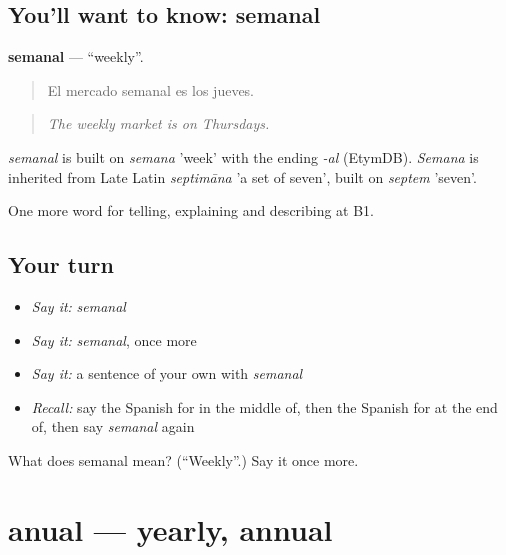 \subsection*{You'll want to know: semanal}
\textbf{semanal} — \textquotedblleft{}weekly\textquotedblright{}.

\begin{quote}
El mercado semanal es los jueves.
\end{quote}

\begin{quote}
\emph{The weekly market is on Thursdays.}
\end{quote}

\begin{cousinweb}
\emph{semanal} is built on \emph{semana} 'week' with the ending \emph{-al} (EtymDB). \emph{Semana} is inherited from Late Latin \emph{septimāna} 'a set of seven', built on \emph{septem} 'seven'.
\end{cousinweb}

\begin{grammarlens}[title={What you've built}]
One more word for telling, explaining and describing at B1.
\end{grammarlens}

\subsection*{Your turn}
\begin{itemize}
\raggedright
  \item \emph{Say it:} \emph{semanal}
  \item \emph{Say it:} \emph{semanal}, once more
  \item \emph{Say it:} a sentence of your own with \emph{semanal}
  \item \emph{Recall:} say the Spanish for in the middle of, then the Spanish for at the end of, then say \emph{semanal} again
\end{itemize}

\begin{tcolorbox}[breakable,colback=teal!4,colframe=teal!35!black,title={Before you move on}]
What does semanal mean? (\textquotedblleft{}Weekly\textquotedblright{}.) Say it once more.
\end{tcolorbox}
\section[anual]{anual — yearly, annual}

\label{lesson:ES-C540-anual}



